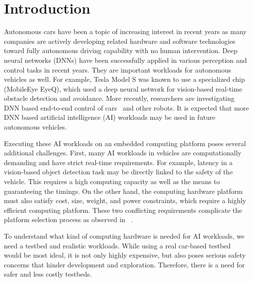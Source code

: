 \section{Introduction} \label{sec:intro}

%
%
Autonomous cars have been a topic of increasing interest in recent
years as many companies are actively developing related hardware
and software technologies toward fully autonomous driving capability with
no human intervention. Deep neural networks (DNNs) have been
successfully applied in various perception and control tasks in
recent years.  They are important workloads for autonomous vehicles
as well. For example, Tesla Model S was known to use a specialized
chip (MobileEye EyeQ), which used a deep neural network for vision-based
real-time obstacle detection and avoidance. More recently, researchers
are investigating DNN based end-to-end control of
cars~\cite{Bojarski2016} and other robots. It is expected that more
DNN based artificial intelligence (AI) workloads may be used in future
autonomous vehicles.

Executing these AI workloads on an embedded computing platform 
poses several additional challenges. First, many AI workloads in vehicles 
are computationally demanding and have strict real-time requirements. 
For example, latency in a vision-based object
detection task may be directly linked to the safety of the vehicle. This
requires a high computing capacity as well as the means to guaranteeing
the timings. On the other hand, the computing hardware platform must
also satisfy cost, size, weight, and power constraints, which require a
highly efficient computing platform. These two conflicting
requirements complicate the platform selection process as observed in
~\cite{Otterness2017}.


To understand what kind of computing hardware is needed for AI
workloads, we need a testbed and realistic workloads. While using a
real car-based testbed would be most ideal, it is not only highly
expensive, but also poses serious safety concerns that hinder
development and exploration. Therefore, there is a need for safer and
less costly testbeds.

